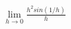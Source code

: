 \documentclass[preview]{standalone}
\begin{document}
\begin{align*}
\lim_{h\to 0} \frac{h^{2}sin(1/h)}{h}
\end{align*}
\end{document}
